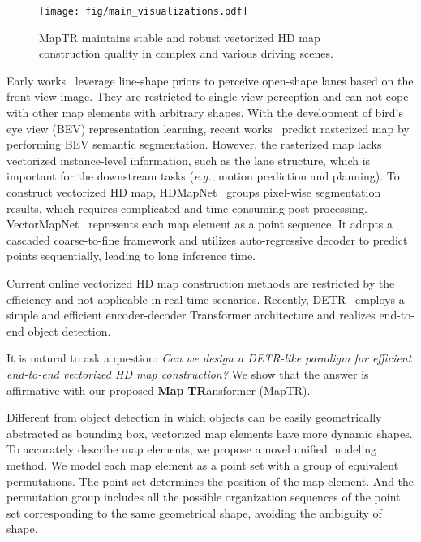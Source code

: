 \documentclass{article} \usepackage{iclr2023_conference,times}
\def\eg{\emph{e.g.}} \def\Eg{\emph{E.g.}}
\begin{document}
\begin{figure}[t!]
    \begin{center}
    \texttt{[image: fig/main\_visualizations.pdf]}
    \end{center}
    \vspace*{-0.3cm}
    \caption{MapTR maintains stable and robust vectorized HD map construction quality in complex and various driving scenes.}
    \label{fig:visualization}
    \vspace*{-0.8cm}
\end{figure}

Early works~\citep{chen2022persformer,lstr,can2021structured} leverage line-shape priors to perceive open-shape lanes based on the front-view image. They are restricted to single-view perception and can not cope with other map elements with arbitrary shapes.
With the development of bird's eye view (BEV) representation learning,
recent works~\citep{gkt,cvt,fiery,bevformer} predict rasterized map by performing BEV semantic segmentation. 
However, the rasterized map lacks vectorized instance-level information, such as the lane structure,  which is important for the downstream tasks (\eg, motion prediction and planning). 
To construct vectorized HD map, HDMapNet~\citep{hdmapnet} groups pixel-wise segmentation results, which requires complicated and time-consuming post-processing.   VectorMapNet~\citep{vectormapnet} represents each map element as a point sequence. It adopts a cascaded coarse-to-fine framework  and utilizes auto-regressive decoder to predict points sequentially, leading to long inference time.

Current online vectorized HD map construction methods are restricted by the efficiency and 
not applicable in real-time scenarios.
Recently, DETR~\citep{detr} employs a simple and efficient encoder-decoder Transformer architecture and realizes end-to-end object detection.  


It is natural to ask a question: \textit{Can we design a DETR-like paradigm for efficient end-to-end vectorized HD map construction?} We show that the answer is affirmative with our proposed  \textbf{Map} \textbf{TR}ansformer (MapTR).






Different from object detection in which objects can be easily geometrically abstracted as bounding box, vectorized map elements have more dynamic shapes.
To accurately describe map elements,
we propose a novel unified modeling method. 
We model each map element as a point set with a group of equivalent permutations.
The point set determines the position of the map element. 
And the permutation group includes all the possible organization sequences of the point set corresponding to the same geometrical shape, avoiding the ambiguity of shape.
\end{document}
